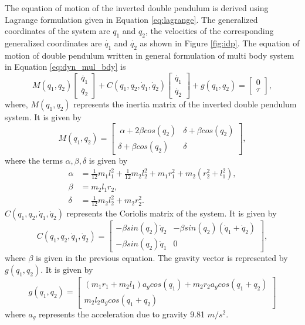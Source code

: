 The equation of motion of the inverted double pendulum is derived using Lagrange formulation given in Equation \ref{eq:lagrange}. The generalized coordinates of the system are $q_1$ and $q_2$, the velocities of the corresponding generalized coordinates are $\dot{q_1}$ and $\dot{q_2}$ as shown in Figure \ref{fig:idp}. The equation of motion of double pendulum written in general formulation of multi body system in Equation \ref{eq:dyn_mul_bdy} is
\begin{equation}
   \label{eq:dyn_idp}
	M(q_1,q_2)
	\begin{bmatrix}
		\ddot{q_{1}} \\
		\ddot{q_{2}} 
	\end{bmatrix}
	+ C(q_1,q_2,\dot{q}_1,\dot{q}_2)
    \begin{bmatrix}
		\dot{q_{1}} \\
		\dot{q_{2}} 
	\end{bmatrix}
	+ g(q_1,q_2) = 
    \begin{bmatrix} 0 \\ \tau \end{bmatrix},
\end{equation}
where, $M(q_1,q_2)$ represents the inertia matrix of the inverted double pendulum system. It is given by 
$$ M(q_1,q_2) = \begin{bmatrix}\
    \alpha+2\beta cos(q_2) & \delta + \beta cos(q_2) \\ 
    \delta + \beta cos(q_2) & \delta  \end{bmatrix},$$ where the terms $\alpha, \beta, \delta$ is given by
    $$
    \begin{aligned}
    \alpha &= \frac{1}{12} m_1 l_1^2 + \frac{1}{12} m_2 l_2^2 + m_1 r_1^2 + m_2 (r_2^2 + l_1^2),\\
    \beta &= m_2 l_1 r_2, \\
    \delta &= \frac{1}{12} m_2 l_2^2 + m_2 r_2^2.
    \end{aligned}
    $$
$C(q_1,q_2,\dot{q}_1,\dot{q}_2)$ represents the Coriolis matrix of the system. It is given by 
$$C(q_1,q_2,\dot{q}_1,\dot{q}_2) = 
\begin{bmatrix}
-\beta sin(q_2) \dot{q}_2 &-\beta sin(q_2)(\dot{q}_1 + \dot{q}_2) \\
-\beta sin(q_2) \dot{q}_1 & 0
\end{bmatrix},
$$
where $\beta$ is given in the previous equation. The gravity vector is represented by $g(q_1,q_2)$. It is given by
$$g(q_1,q_2) = 
\begin{bmatrix}
(m_1 r_1 +m_2 l_1)a_g cos(q_1) + m_2 r_2 a_g cos(q_1+q_2) \\
m_2 l_2 a_g cos(q_1+q_2)
\end{bmatrix}
$$
where $a_g$ represents the acceleration due to gravity 9.81 $m/{s}^2$.

